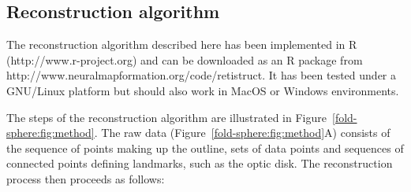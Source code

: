 \documentclass[10pt]{article}
\begin{document}
\subsection*{Reconstruction algorithm}
\label{retistruct_plos:sec:reconstr-algor}

The reconstruction algorithm described here has been implemented in R
(http://www.r-project.org) and can be downloaded as an R package from
http://www.neuralmapformation.org/code/retistruct. It has been tested
under a GNU/Linux platform but should also work in MacOS or Windows
environments.

The steps of the reconstruction algorithm are illustrated in
Figure~\ref{fold-sphere:fig:method}. The raw data
(Figure~\ref{fold-sphere:fig:method}A) consists of the sequence of
points making up the outline, sets of data points and sequences of
connected points defining landmarks, such as the optic disk. The
reconstruction process then proceeds as follows:
\end{document}
